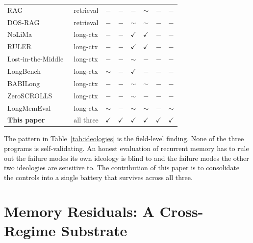\documentclass{article}
\begin{document}
\begin{table}[t]
\begin{tabular}{llcccccc}
RAG~\cite{ragoriginal2020}                         & retrieval & $-$    & $-$    & $-$           & $\sim$        & $-$ & $-$    \\
DOS-RAG~\cite{ragbaseline2025}                     & retrieval & $-$    & $-$    & $\sim$        & $\sim$        & $-$ & $-$    \\
NoLiMa~\cite{nolima2025}                           & long-ctx  & $-$    & $-$    & $\checkmark$  & $\checkmark$  & $-$ & $-$    \\
RULER~\cite{ruler2024}                             & long-ctx  & $-$    & $-$    & $\checkmark$  & $\checkmark$  & $-$ & $-$    \\
Lost-in-the-Middle~\cite{lostmiddle2024}           & long-ctx  & $-$    & $-$    & $\sim$        & $-$           & $-$ & $-$    \\
LongBench~\cite{longbench2024}                     & long-ctx  & $\sim$ & $-$    & $\checkmark$  & $-$           & $-$ & $-$    \\
BABILong~\cite{babilong2024}                       & long-ctx  & $-$    & $-$    & $\sim$        & $\sim$        & $-$ & $-$    \\
ZeroSCROLLS~\cite{zeroscrolls2023}                 & long-ctx  & $-$    & $-$    & $\sim$        & $-$           & $-$ & $-$    \\
LongMemEval~\cite{longmemeval2025}                 & long-ctx  & $\sim$ & $-$    & $\sim$        & $\sim$        & $-$ & $\sim$ \\
\textbf{This paper}                                & all three & $\checkmark$ & $\checkmark$ & $\checkmark$ & $\checkmark$ & $\checkmark$ & $\checkmark$ \\
\bottomrule
\end{tabular}
\end{table}

The pattern in Table~\ref{tab:ideologies} is the field-level finding.
None of the three programs is self-validating.  An honest evaluation
of recurrent memory has to rule out the failure modes its own
ideology is blind to and the failure modes the other two ideologies
are sensitive to.  The contribution of this paper is to consolidate
the controls into a single battery that survives across all three.

\section{Memory Residuals: A Cross-Regime Substrate}
\label{sec:memres}
\end{document}
